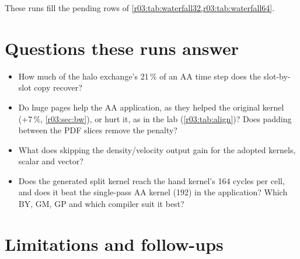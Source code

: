 These runs fill the pending rows of \cref{r03:tab:waterfall32,r03:tab:waterfall64}.

\section{Questions these runs answer}\label{r03:sec:open-questions}

\begin{itemize}
  \item How much of the halo exchange's 21\,\% of an AA time step does the slot-by-slot copy
        recover?
  \item Do huge pages help the AA application, as they helped the original kernel (+7\,\%,
        \cref{r03:sec:bw}), or hurt it, as in the lab (\cref{r03:tab:align})? Does padding
        between the PDF slices remove the penalty?
  \item What does skipping the density/velocity output gain for the adopted kernels, scalar and
        vector?
  \item Does the generated split kernel reach the hand kernel's 164 cycles per cell, and does it
        beat the single-pass AA kernel (192) in the application? Which BY, GM, GP and which
        compiler suit it best?
\end{itemize}

\section{Limitations and follow-ups}\label{r03:sec:open-limits}

